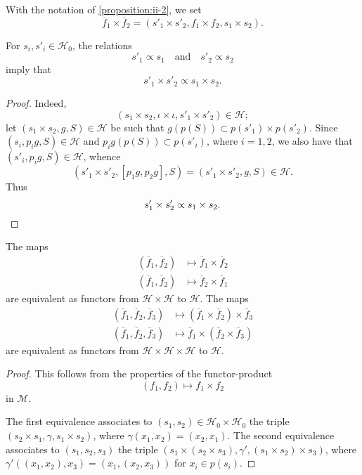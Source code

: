 \documentclass[a4paper,fleqn]{article}
\theoremstyle{plain}
\newenvironment{proposition}[1]
  {\renewcommand\theinnerproposition{#1}\innerproposition}
  {\endinnerproposition}
\theoremstyle{definition}
\newcommand{\textand}{\quad\text{and}\quad}
\newcommand{\HH}{\mathcal{H}}
\newcommand{\MM}{\mathcal{M}}
\newcommand{\subs}{\mathrel{\propto}}
\begin{document}
With the notation of \cref{proposition:ii-2}, we set
\[
  \overline{f}_1\times\overline{f}_2
  = (s'_1\times s'_2, f_1\times f_2, s_1\times s_2).
\]

\begin{proposition}{3}
\label{proposition:ii-3}
  For $s_i,s'_i\in\HH_0$, the relations
  \[
    s'_1\subs s_1
    \textand
    s'_2\subs s_2
  \]
  imply that
  \[
    s'_1\times s'_2
    \subs s_1\times s_2.
  \]
\end{proposition}

\begin{proof}
  Indeed,
  \[
    (s_1\times s_2, \iota\times\iota, s'_1\times s'_2)
    \in\HH;
  \]
  let $(s_1\times s_2,g,S)\in\HH$ be such that $g(p(S))\subset p(s'_1)\times p(s'_2)$.
  Since $(s_i,p_ig,S)\in\HH$ and $p_ig(p(S))\subset p(s'_i)$, where $i=1,2$, we also have that $(s'_i,p_ig,S)\in\HH$, whence
  \[
    (s'_1\times s'_2, [p_1g,p_2g], S)
    = (s'_1\times s'_2,g,S)
    \in\HH.
  \]
  Thus
  \[
    s'_1\times s'_2
    \subs s_1\times s_2.
    \qedhere
  \]
\end{proof}

\begin{proposition}{4}
\label{proposition:ii-4}
  The maps
  \[
    \begin{aligned}
      (\overline{f}_1,\overline{f}_2)
      &\longmapsto \overline{f}_1\times\overline{f}_2
    \\(\overline{f}_1,\overline{f}_2)
      &\longmapsto \overline{f}_2\times\overline{f}_1
    \end{aligned}
  \]
  are equivalent as functors from $\HH\times\HH$ to $\HH$.
  The maps
  \[
    \begin{aligned}
      (\overline{f}_1,\overline{f}_2,\overline{f}_3)
      &\longmapsto (\overline{f}_1\times\overline{f}_2)\times\overline{f}_3
    \\(\overline{f}_1,\overline{f}_2,\overline{f}_3)
      &\longmapsto \overline{f}_1\times(\overline{f}_2\times\overline{f}_3)
    \end{aligned}
  \]
  are equivalent as functors from $\HH\times\HH\times\HH$ to $\HH$.
\end{proposition}

\begin{proof}
  This follows from the properties of the functor-product \cite{3d}
  \[
    (f_1,f_2)
    \longmapsto f_1\times f_2
  \]
  in $\MM$.

  The first equivalence associates to $(s_1,s_2)\in\HH_0\times\HH_0$ the triple $(s_2\times s_1,\gamma,s_1\times s_2)$, where $\gamma(x_1,x_2)=(x_2,x_1)$.
  The second equivalence associates to $(s_1,s_2,s_3)$ the triple $(s_1\times(s_2\times s_3),\gamma',(s_1\times s_2)\times s_3)$, where $\gamma'((x_1,x_2),x_3)=(x_1,(x_2,x_3))$ for $x_i\in p(s_i)$.
\end{proof}
\end{document}
